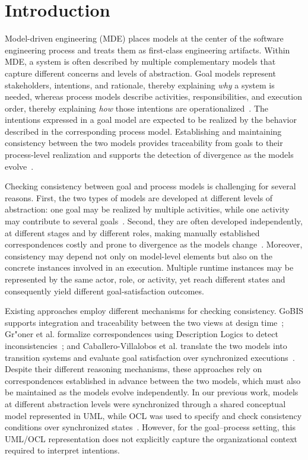 \documentclass[a4paper, conference]{IEEEtran}
\begin{document}
\section{Introduction}
\label{sect:intro}

Model-driven engineering (MDE) places models at the center of the software engineering process and treats them as first-class engineering artifacts. Within MDE, a system is often described by multiple complementary models that capture different concerns and levels of abstraction. Goal models represent stakeholders, intentions, and rationale, thereby explaining \emph{why} a system is needed, whereas process models describe activities, responsibilities, and execution order, thereby explaining \emph{how} those intentions are operationalized~\cite{gobis2015}. The intentions expressed in a goal model are expected to be realized by the behavior described in the corresponding process model. Establishing and maintaining consistency between the two models provides traceability from goals to their process-level realization and supports the detection of divergence as the models evolve~\cite{gobis2015,caballero2026alig}.

Checking consistency between goal and process models is challenging for several reasons. First, the two types of models are developed at different levels of abstraction: one goal may be realized by multiple activities, while one activity may contribute to several goals~\cite{groner2014vadl,caballero2026alig}. Second, they are often developed independently, at different stages and by different roles, making manually established correspondences costly and prone to divergence as the models change~\cite{gobis2015,groner2014vadl}. Moreover, consistency may depend not only on model-level elements but also on the concrete instances involved in an execution. Multiple runtime instances may be represented by the same actor, role, or activity, yet reach different states and consequently yield different goal-satisfaction outcomes.

Existing approaches employ different mechanisms for checking consistency. GoBIS supports integration and traceability between the two views at design time~\cite{gobis2015}; Gr"oner et al. formalize correspondences using Description Logics to detect inconsistencies~\cite{groner2014vadl}; and Caballero-Villalobos et al. translate the two models into transition systems and evaluate goal satisfaction over synchronized executions~\cite{caballero2026alig}. Despite their different reasoning mechanisms, these approaches rely on correspondences established in advance between the two models, which must also be maintained as the models evolve independently.
In our previous work, models at different abstraction levels were synchronized through a shared conceptual model represented in UML, while OCL was used to specify and check consistency conditions over synchronized states~\cite{dang2010jucs}. However, for the goal--process setting, this UML/OCL representation does not explicitly capture the organizational context required to interpret intentions.
\end{document}
